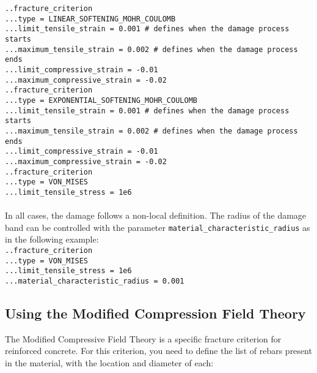 \documentclass[10pt]{article}
\begin{document}
\noindent \verb+..fracture_criterion+\\
\verb+...type = LINEAR_SOFTENING_MOHR_COULOMB+\\
\verb+...limit_tensile_strain = 0.001 # defines when the damage process starts+\\
\verb+...maximum_tensile_strain = 0.002 # defines when the damage process ends+\\
\verb+...limit_compressive_strain = -0.01+\\
\verb+...maximum_compressive_strain = -0.02+\\

\noindent \verb+..fracture_criterion+\\
\verb+...type = EXPONENTIAL_SOFTENING_MOHR_COULOMB+\\
\verb+...limit_tensile_strain = 0.001 # defines when the damage process starts+\\
\verb+...maximum_tensile_strain = 0.002 # defines when the damage process ends+\\
\verb+...limit_compressive_strain = -0.01+\\
\verb+...maximum_compressive_strain = -0.02+\\

\noindent \verb+..fracture_criterion+\\
\verb+...type = VON_MISES+\\
\verb+...limit_tensile_stress = 1e6+

\paragraph{} In all cases, the damage follows a non-local definition. The radius of the damage band can be controlled with the parameter \verb+material_characteristic_radius+ as in the following example:\\

\noindent \verb+..fracture_criterion+\\
\verb+...type = VON_MISES+\\
\verb+...limit_tensile_stress = 1e6+\\
\verb+...material_characteristic_radius = 0.001+\\

\subsection{Using the Modified Compression Field Theory}

The Modified Compressive Field Theory is a specific fracture criterion for reinforced concrete. For this criterion, you need to define the list of rebars present in the material, with the location and diameter of each:\\
\end{document}
